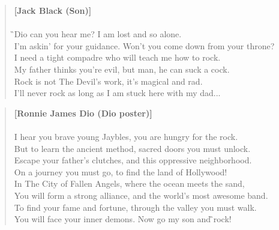 \documentclass[9pt,a4paper,oneside, onecolumn]{article}
\begin{document}
\begin{verse}
\textbf{[Jack Black (Son)]}\\
\mbox{
}\\
\G{}Dio can you hear me? I am \Hb{}lost and so alone.\\
I'm \F{}askin' for your guidance. Won't you \Gis{}come down from your throne?\\
I need a tight compadre who will teach me how to rock.\\
My father thinks you're evil, but man, he can suck a cock.\\
Rock is not The Devil's work, it's magical and rad.\\
I'll never rock as long as I am stuck here with my dad...
\Gf{}\qquad\Gisf{}\qquad\Ff{}\qquad\Hbf{}\qquad\Gisf{}

\end{verse}
\begin{verse}
\textbf{[Ronnie James Dio (Dio poster)]}\\
\mbox{
}\\
I \Cf{}hear you brave young Jaybles, you are \Cf{}hungry for the rock.\\
But to \Cf{}learn the ancient method, sacred \Ff{}doors you must unlock.\\
Escape your father's clutches, and this oppressive neighborhood.\\
On a journey you must go, to find the land of Hollywood!\\
In The \Cf{}City of Fallen Angels, where the \Ff{}ocean meets the \Gisf{}sand,\\
You will \Cf{}form a strong alliance, and the \Ff{}world's most \Gf{}awesome \Gisf{}band.\\
To find your fame and fortune, through the valley you must walk.\\
You will face your inner demons. Now go my son and \G{}rock!\Dis{}\qquad\D{}\qquad\qquad\C{}\qquad\D{}\qquad\Dis{}\qquad\F{}


\end{verse}
\end{document}
